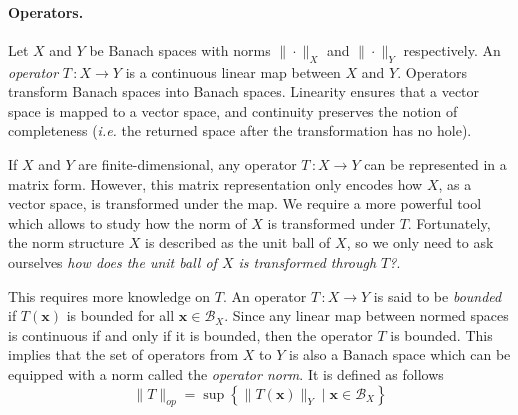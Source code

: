 
\paragraph*{Operators.} 
Let $X$ and $Y$ be Banach spaces with norms $\|\cdot\|_X$ and $\|\cdot\|_Y$ respectively. An \emph{operator} $T\,\colon X\rightarrow Y$ is a continuous linear map between $X$ and $Y$. Operators transform Banach spaces into Banach spaces. Linearity ensures that a vector space is mapped to a vector space, and continuity preserves the notion of completeness (\emph{i.e.} the returned space after the transformation has no hole).

If $X$ and $Y$ are finite-dimensional, any operator $T\,\colon X\rightarrow Y$ can be represented in a matrix form. However, this matrix representation only encodes how $X$, as a vector space, is transformed under the map. We require a more powerful tool which allows to study how the norm of $X$ is transformed under $T$. Fortunately, the norm structure $X$ is described as the unit ball of $X$, so we only need to ask ourselves \emph{how does the unit ball of $X$ is transformed through $T$?}. 

This requires more knowledge on $T$. An operator $T\,\colon X\rightarrow Y$ is said to be \emph{bounded} if $T(\mathbf{x})$ is bounded for all $\mathbf{x} \in \mathcal{B}_X$. Since any linear map between normed spaces is continuous if and only if it is bounded, then the operator $T$ is bounded. This implies that the set of operators from $X$ to $Y$ is also a Banach space which can be equipped with a norm called the \emph{operator norm}. It is defined as follows
$$\|T\|_{op} = \sup\left\{\|T(\mathbf{x})\|_Y\mid \mathbf{x}\in \mathcal{B}_X \right\}$$

